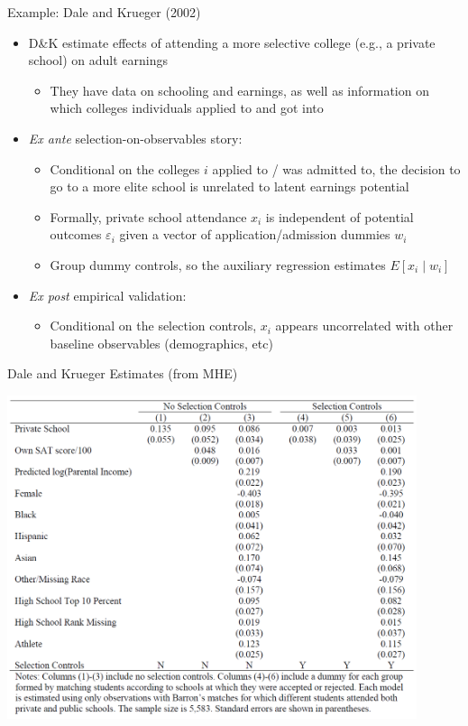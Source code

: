 \documentclass[11pt,english]{beamer}
\begin{document}
\begin{frame}{Example: Dale and Krueger (2002)}
\begin{itemize}
\item D\&K estimate effects of attending a more selective college (e.g., a private school) on adult earnings\smallskip
\begin{itemize}
\item They have data on schooling and earnings, as well as information on which colleges individuals applied to and got into
\end{itemize}\bigskip\pause{}

\item \emph{Ex ante} selection-on-observables story: \smallskip
\begin{itemize}
\item Conditional on the colleges $i$ applied to / was admitted to, the decision to go to a more elite school is unrelated to latent earnings potential \smallskip\pause{}
\item Formally, private school attendance $x_i$ is independent of potential outcomes $\varepsilon_i$ given a vector of application/admission dummies $w_i$\smallskip\pause{}
\item Group dummy controls, so the auxiliary regression estimates $E[x_i\mid w_i]$
\end{itemize}\bigskip\pause{}

\item \emph{Ex post} empirical validation:\smallskip
\begin{itemize}
\item Conditional on the selection controls, $x_i$ appears uncorrelated with other baseline observables (demographics, etc)
\end{itemize}
\end{itemize}

\end{frame}

\begin{frame}{Dale and Krueger Estimates (from MHE)}
\vspace{-0.1cm}
\begin{center}
	\includegraphics[width=0.9\textwidth]{figures/DK02.png}
\end{center}

\end{frame}
\end{document}
